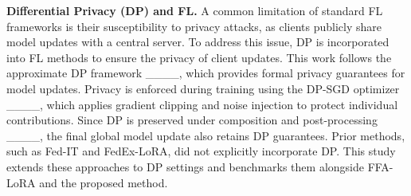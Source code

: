 \textbf{Differential Privacy (DP) and FL.}
A common limitation of standard FL frameworks is their susceptibility to privacy attacks, as clients publicly share model updates with a central server. 
To address this issue, DP is incorporated into FL methods to ensure the privacy of client updates. 
This work follows the approximate DP framework ____, which provides formal privacy guarantees for model updates.
Privacy is enforced during training using the DP-SGD optimizer ____, which applies gradient clipping and noise injection to protect individual contributions. 
Since DP is preserved under composition and post-processing ____, the final global model update also retains DP guarantees.
Prior methods, such as Fed-IT and FedEx-LoRA, did not explicitly incorporate DP. 
This study extends these approaches to DP settings and benchmarks them alongside FFA-LoRA and the proposed method.